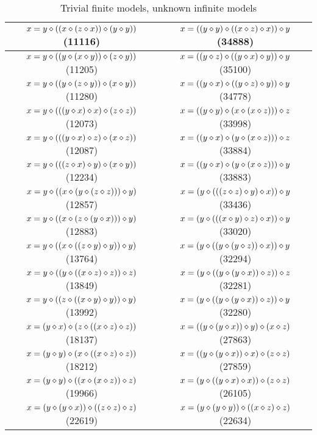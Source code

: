 \begin{table}[h]
\begin{tabular}{|c|c|}
$x = y \diamond ((x \diamond (z \diamond x)) \diamond (y \diamond y))$ (11116) & $x = ((y \diamond y) \diamond ((x \diamond z) \diamond x)) \diamond y$ (34888) \\ \hline
$x = y \diamond ((y \diamond (x \diamond y)) \diamond (z \diamond y))$ (11205) & $x = ((y \diamond z) \diamond ((y \diamond x) \diamond y)) \diamond y$ (35100) \\ \hline
$x = y \diamond ((y \diamond (z \diamond y)) \diamond (x \diamond y))$ (11280) & $x = ((y \diamond x) \diamond ((y \diamond z) \diamond y)) \diamond y$ (34778) \\ \hline
$x = y \diamond (((y \diamond x) \diamond x) \diamond (z \diamond z))$ (12073) & $x = ((y \diamond y) \diamond (x \diamond (x \diamond z))) \diamond z$ (33998) \\ \hline
$x = y \diamond (((y \diamond x) \diamond z) \diamond (x \diamond z))$ (12087) & $x = ((y \diamond x) \diamond (y \diamond (x \diamond z))) \diamond z$ (33884) \\ \hline
$x = y \diamond (((z \diamond x) \diamond y) \diamond (x \diamond y))$ (12234) & $x = ((y \diamond x) \diamond (y \diamond (x \diamond z))) \diamond y$ (33883) \\ \hline
$x = y \diamond ((x \diamond (y \diamond (z \diamond z))) \diamond y)$ (12857) & $x = (y \diamond (((z \diamond z) \diamond y) \diamond x)) \diamond y$ (33436) \\ \hline
$x = y \diamond ((x \diamond (z \diamond (y \diamond x))) \diamond y)$ (12883) & $x = (y \diamond (((x \diamond y) \diamond z) \diamond x)) \diamond y$ (33020) \\ \hline
$x = y \diamond ((x \diamond ((z \diamond y) \diamond y)) \diamond y)$ (13764) & $x = (y \diamond ((y \diamond (y \diamond z)) \diamond x)) \diamond y$ (32294) \\ \hline
$x = y \diamond ((y \diamond ((x \diamond z) \diamond z)) \diamond z)$ (13849) & $x = (y \diamond ((y \diamond (y \diamond x)) \diamond z)) \diamond z$ (32281) \\ \hline
$x = y \diamond ((z \diamond ((x \diamond y) \diamond y)) \diamond y)$ (13992) & $x = (y \diamond ((y \diamond (y \diamond x)) \diamond z)) \diamond y$ (32280) \\ \hline
$x = (y \diamond x) \diamond (z \diamond ((x \diamond z) \diamond z))$ (18137) & $x = ((y \diamond (y \diamond x)) \diamond y) \diamond (x \diamond z)$ (27863) \\ \hline
$x = (y \diamond y) \diamond (x \diamond ((x \diamond z) \diamond z))$ (18212) & $x = ((y \diamond (y \diamond x)) \diamond x) \diamond (z \diamond z)$ (27859) \\ \hline
$x = (y \diamond y) \diamond ((x \diamond (x \diamond z)) \diamond z)$ (19966) & $x = (y \diamond ((y \diamond x) \diamond x)) \diamond (z \diamond z)$ (26105) \\ \hline
$x = (y \diamond (y \diamond x)) \diamond ((z \diamond z) \diamond z)$ (22619) & $x = (y \diamond (y \diamond y)) \diamond ((x \diamond z) \diamond z)$ (22634) \\ \hline
\end{tabular}
\caption{Trivial finite models, unknown infinite models}
\label{table2}
\end{table}

